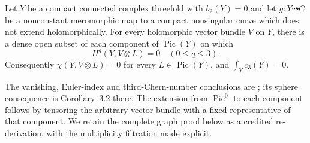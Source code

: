 
\begin{proposition}\label{cdp:st:E2}
Let $Y$ be a compact connected complex threefold with $b_2(Y)=0$ and
let $g:Y\dashrightarrow C$ be a nonconstant meromorphic map to a
compact nonsingular curve which does not extend holomorphically.
For every holomorphic vector bundle $V$ on $Y$, there is a dense open
subset of each component of $\operatorname{Pic}(Y)$ on which
\[
 H^q(Y,V\otimes L)=0\quad(0\leq q\leq3).
\]
Consequently $\chi(Y,V\otimes L)=0$ for every $L\in\operatorname{Pic}(Y)$,
and $\int_Yc_3(Y)=0$.
\end{proposition}

The vanishing, Euler-index and third-Chern-number conclusions are \citet[Theorem~3.1, p.~9]{LRS2019}; its sphere consequence is Corollary~3.2 there. The extension from $\operatorname{Pic}^0$ to each component follows by tensoring the arbitrary vector bundle with a fixed representative of that component. We retain the complete graph proof below as a credited re-derivation, with the multiplicity filtration made explicit.

